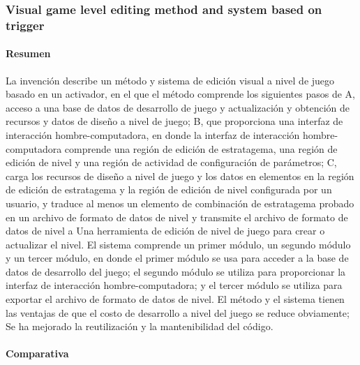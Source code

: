 \documentclass[]{article}
\begin{document}
\subsubsection{Visual game level editing method and system based on trigger}
\paragraph{Resumen}
La invenci\'on describe un m\'etodo y sistema de edici\'on visual a nivel de juego basado en un activador, en el que el m\'etodo comprende los siguientes pasos de 
\newline
\newline A, acceso a una base de datos de desarrollo de juego y actualizaci\'on y obtenci\'on de recursos y datos de dise\~no a nivel de juego; 
\newline
\newline B, que proporciona una interfaz de interacci\'on hombre-computadora, en donde la interfaz de interacci\'on hombre-computadora comprende una regi\'on de edici\'on de estratagema, una regi\'on de edici\'on de nivel y una regi\'on de actividad de configuraci\'on de par\'ametros; 
\newline
\newline
C, carga los recursos de dise\~no a nivel de juego y los datos en elementos en la regi\'on de edici\'on de estratagema y la regi\'on de edici\'on de nivel configurada por un usuario, y traduce al menos un elemento de combinaci\'on de estratagema probado en un archivo de formato de datos de nivel y transmite el archivo de formato de datos de nivel a Una herramienta de edici\'on de nivel de juego para crear o actualizar el nivel. \newline 
\newline El sistema comprende un primer m\'odulo, un segundo m\'odulo y un tercer m\'odulo, en donde el primer m\'odulo se usa para acceder a la base de datos de desarrollo del juego; el segundo m\'odulo se utiliza para proporcionar la interfaz de interacci\'on hombre-computadora; y el tercer m\'odulo se utiliza para exportar el archivo de formato de datos de nivel. El m\'etodo y el sistema tienen las ventajas de que el costo de desarrollo a nivel del juego se reduce obviamente; Se ha mejorado la reutilizaci\'on y la mantenibilidad del c\'odigo.
\cite{leveledit}
\paragraph{Comparativa}
\end{document}
